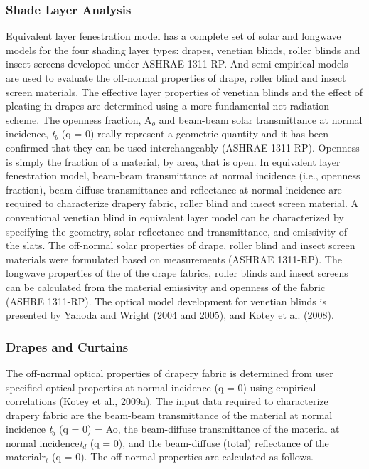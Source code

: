 \subsubsection{Shade Layer Analysis}\label{shade-layer-analysis}

Equivalent layer fenestration model has a complete set of solar and longwave models for the four shading layer types: drapes, venetian blinds, roller blinds and insect screens developed under ASHRAE 1311-RP. And semi-empirical models are used to evaluate the off-normal properties of drape, roller blind and insect screen materials. The effective layer properties of venetian blinds and the effect of pleating in drapes are determined using a more fundamental net radiation scheme. The openness fraction, A\(_{o}\) and beam-beam solar transmittance at normal incidence, \emph{t}\(_{b}\) (q = 0) really represent a geometric quantity and it has been confirmed that they can be used interchangeably (ASHRAE 1311-RP). Openness is simply the fraction of a material, by area, that is open. In equivalent layer fenestration model, beam-beam transmittance at normal incidence (i.e., openness fraction), beam-diffuse transmittance and reflectance at normal incidence are required to characterize drapery fabric, roller blind and insect screen material. A conventional venetian blind in equivalent layer model can be characterized by specifying the geometry, solar reflectance and transmittance, and emissivity of the slats. The off-normal solar properties of drape, roller blind and insect screen materials were formulated based on measurements (ASHRAE 1311-RP). The longwave properties of the of the drape fabrics, roller blinds and insect screens can be calculated from the material emissivity and openness of the fabric (ASHRE 1311-RP). The optical model development for venetian blinds is presented by Yahoda and Wright (2004 and 2005), and Kotey et al. (2008).

\subsubsection{Drapes and Curtains}\label{drapes-and-curtains}

The off-normal optical properties of drapery fabric is determined from user specified optical properties at normal incidence (q = 0) using empirical correlations (Kotey et al., 2009a). The input data required to characterize drapery fabric are the beam-beam transmittance of the material at normal incidence \emph{t}\(_{b}\) (q = 0) = Ao, the beam-diffuse transmittance of the material at normal incidence\emph{t}\(_{d}\) (q = 0), and the beam-diffuse (total) reflectance of the materialr\(_{t}\) (q = 0). The off-normal properties are calculated as follows.

